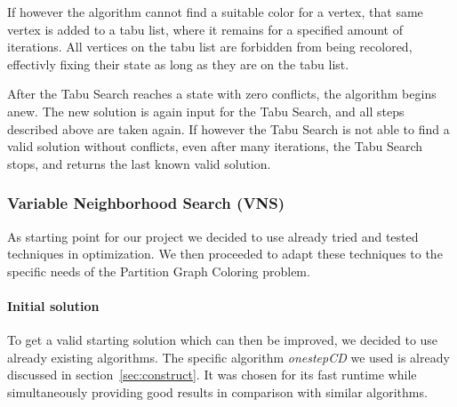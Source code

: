 \documentclass[paper=a4,fontsize=12pt]{scrartcl}
\begin{document}
{If however the algorithm cannot find a suitable color for a vertex, that same vertex is added to a tabu list, where it remains for a specified amount of iterations. All vertices on the tabu list are forbidden from being recolored, effectivly fixing their state as long as they are on the tabu list.


After the Tabu Search reaches a state with zero conflicts, the algorithm begins anew. The new solution is again input for the Tabu Search, and all steps described above are taken again. If however the Tabu Search is not able to find a valid solution without conflicts, even after many iterations, the Tabu Search stops, and returns the last known valid solution.}


\subsubsection{Variable Neighborhood Search (VNS)}
As starting point for our project we decided to use already tried and tested techniques in optimization. We then proceeded to adapt these techniques to the specific needs of the Partition Graph Coloring problem.


\paragraph{Initial solution}{
To get a valid starting solution which can then be improved, we decided to use already existing algorithms. The specific algorithm \emph{onestepCD} we used is already discussed in section~\ref{sec:construct}. It was chosen for its fast runtime while simultaneously providing good results in comparison with similar algorithms.

}
\end{document}
